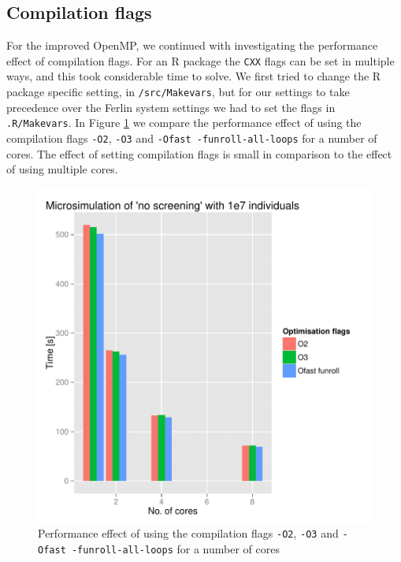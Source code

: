 

\subsection{Compilation flags}

For the improved OpenMP, we continued with investigating the
performance effect of compilation flags. For an R package the
\texttt{CXX} flags can be set in multiple ways, and this took
considerable time to solve. We first tried to change the R package
specific setting, in \texttt{/src/Makevars}, but for our settings to
take precedence over the Ferlin system settings we had to set the
flags in \texttt{.R/Makevars}. In Figure \ref{fig:flagScaling} we
compare the performance effect of using the compilation flags
\texttt{-O2}, \texttt{-O3} and \texttt{-Ofast -funroll-all-loops} for
a number of cores. The effect of setting compilation flags is small in
comparison to the effect of using multiple cores.

\begin{figure}[!htbp] \centering
  \includegraphics[height=0.5\textheight]{images/flagsProfiling.pdf}
  \caption{Performance effect of using the compilation flags \texttt{-O2}, \texttt{-O3} and \texttt{-Ofast -funroll-all-loops} for a number of cores}
  \label{fig:flagScaling}
\end{figure}





